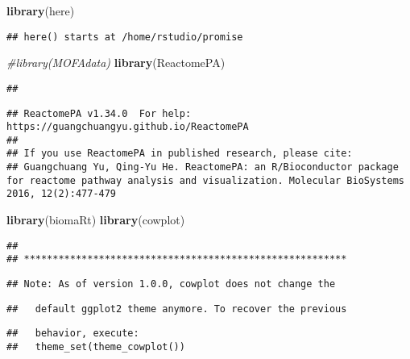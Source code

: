 \documentclass[
]{article}
\newenvironment{Shaded}{\begin{snugshade}}{\end{snugshade}}
\newcommand{\CommentTok}[1]{\textcolor[rgb]{0.56,0.35,0.01}{\textit{#1}}}
\newcommand{\KeywordTok}[1]{\textcolor[rgb]{0.13,0.29,0.53}{\textbf{#1}}}
\newcommand{\NormalTok}[1]{#1}
\begin{document}
\begin{Shaded}
\begin{Highlighting}[]
\KeywordTok{library}\NormalTok{(here)}
\end{Highlighting}
\end{Shaded}

\begin{verbatim}
## here() starts at /home/rstudio/promise
\end{verbatim}

\begin{Shaded}
\begin{Highlighting}[]
\CommentTok{#library(MOFAdata)}
\KeywordTok{library}\NormalTok{(ReactomePA)}
\end{Highlighting}
\end{Shaded}

\begin{verbatim}
## 
\end{verbatim}

\begin{verbatim}
## ReactomePA v1.34.0  For help: https://guangchuangyu.github.io/ReactomePA
## 
## If you use ReactomePA in published research, please cite:
## Guangchuang Yu, Qing-Yu He. ReactomePA: an R/Bioconductor package for reactome pathway analysis and visualization. Molecular BioSystems 2016, 12(2):477-479
\end{verbatim}

\begin{Shaded}
\begin{Highlighting}[]
\KeywordTok{library}\NormalTok{(biomaRt)}
\KeywordTok{library}\NormalTok{(cowplot)}
\end{Highlighting}
\end{Shaded}

\begin{verbatim}
## 
## ********************************************************
\end{verbatim}

\begin{verbatim}
## Note: As of version 1.0.0, cowplot does not change the
\end{verbatim}

\begin{verbatim}
##   default ggplot2 theme anymore. To recover the previous
\end{verbatim}

\begin{verbatim}
##   behavior, execute:
##   theme_set(theme_cowplot())
\end{verbatim}
\end{document}
